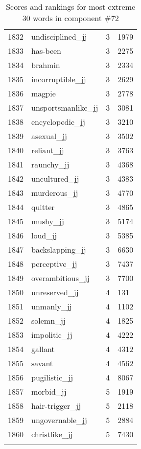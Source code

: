 \begin{longtable}[!htbp]{| rlr@{.}l |}
    1832 & undisciplined\_jj & 3 & 1979 \\
    1833 & has-been & 3 & 2275 \\
    1834 & brahmin & 3 & 2334 \\
    1835 & incorruptible\_jj & 3 & 2629 \\
    1836 & magpie & 3 & 2778 \\
    1837 & unsportsmanlike\_jj & 3 & 3081 \\
    1838 & encyclopedic\_jj & 3 & 3210 \\
    1839 & asexual\_jj & 3 & 3502 \\
    1840 & reliant\_jj & 3 & 3763 \\
    1841 & raunchy\_jj & 3 & 4368 \\
    1842 & uncultured\_jj & 3 & 4383 \\
    1843 & murderous\_jj & 3 & 4770 \\
    1844 & quitter & 3 & 4865 \\
    1845 & mushy\_jj & 3 & 5174 \\
    1846 & loud\_jj & 3 & 5385 \\
    1847 & backslapping\_jj & 3 & 6630 \\
    1848 & perceptive\_jj & 3 & 7437 \\
    1849 & overambitious\_jj & 3 & 7700 \\
    1850 & unreserved\_jj & 4 & 131 \\
    1851 & unmanly\_jj & 4 & 1102 \\
    1852 & solemn\_jj & 4 & 1825 \\
    1853 & impolitic\_jj & 4 & 4222 \\
    1854 & gallant & 4 & 4312 \\
    1855 & savant & 4 & 4562 \\
    1856 & pugilistic\_jj & 4 & 8067 \\
    1857 & morbid\_jj & 5 & 1919 \\
    1858 & hair-trigger\_jj & 5 & 2118 \\
    1859 & ungovernable\_jj & 5 & 2884 \\
    1860 & christlike\_jj & 5 & 7430 \\
    \hline
    \caption{Scores and rankings for most extreme 30 words in component \#72} \\
\end{longtable}
